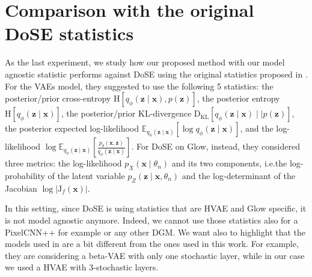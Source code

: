 {\section{Comparison with the original DoSE statistics}
As the last experiment, we study how our proposed method with our model agnostic statistic performs against DoSE using the original statistics proposed in \cite{morningstar_density_2021}. For the VAEs model, they suggested to use the following 5 statistics: the posterior/prior cross-entropy $\text{H}[q_{\phi}( \textbf{z}\mid \textbf{x}), p(\textbf{z})]$, the posterior entropy $\text{H}[q_{\phi}(\textbf{z}\mid \textbf{x})]$, the posterior/prior KL-divergence $\text{D}_{\text{KL}}[q_{\phi}(\textbf{z}\mid \textbf{x}) \mid \mid p(\textbf{z})]$, the posterior expected log-likelihood $\mathbb{E}_{q_{\phi}(\textbf{z}\mid \textbf{x})}[\log q_{\phi}(\textbf{z}\mid \mathbf{x})]$, and the log-likelihood $\log \mathbb{E}_{q_{\phi}(\textbf{z}\mid \textbf{x})} \left[ \frac{p_{\theta}(\textbf{x}, \textbf{z})}{q_{\phi}(\textbf{z}\mid \textbf{x})}\right]$. For DoSE on Glow, instead, they considered three metrics: the log-likelihood $p_{X}(\textbf{x}\mid \theta_n)$ and its two components, i.e.\@ the log-probability of the latent variable $p_{Z}(\textbf{z}\mid \textbf{x}, \theta_n)$ and the log-determinant of the Jacobian $\log | \text{J}_{f}(\textbf{x})|$. 

In this setting, since DoSE is using statistics that are HVAE and Glow specific, it is not model agnostic anymore. Indeed, we cannot use those statistics also for a PixelCNN++ for example or any other DGM. We want also to highlight that the models used in \cite{morningstar_density_2021} are a bit different from the ones used in this work. For example, they are considering a beta-VAE with only one stochastic layer, while in our case we used a HVAE with 3-stochastic layers. 




}

